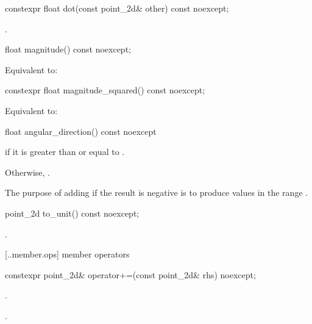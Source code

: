 %
\begin{itemdecl}
constexpr float dot(const point_2d& other) const noexcept;
\end{itemdecl}
\begin{itemdescr}
\pnum
\returns
{}.
\end{itemdescr}

%
\begin{itemdecl}
float magnitude() const noexcept;
\end{itemdecl}
\begin{itemdescr}
\pnum
\returns
Equivalent to: 
\end{itemdescr}

%
\begin{itemdecl}
constexpr float magnitude_squared() const noexcept;
\end{itemdecl}
\begin{itemdescr}
\pnum
\returns
Equivalent to: 
\end{itemdescr}

%
\begin{itemdecl}
float angular_direction() const noexcept
\end{itemdecl}
\begin{itemdescr}
\pnum
\returns
{} if it is greater than or equal to .

\pnum
Otherwise, . 

\pnum
\begin{note}
The purpose of adding  if the result is negative is to produce values in the range .
\end{note}
\end{itemdescr}

%
\begin{itemdecl}
point_2d to_unit() const noexcept;
\end{itemdecl}
\begin{itemdescr}
\pnum
\returns
{}.
\end{itemdescr}

 [\iotwod.\pointtwod.member.ops] { member operators}

%
\begin{itemdecl}
constexpr point_2d& operator+=(const point_2d& rhs) noexcept;
\end{itemdecl}
\begin{itemdescr}
\pnum
\effects
{}.
	
\pnum
\returns
{}.
\end{itemdescr}


